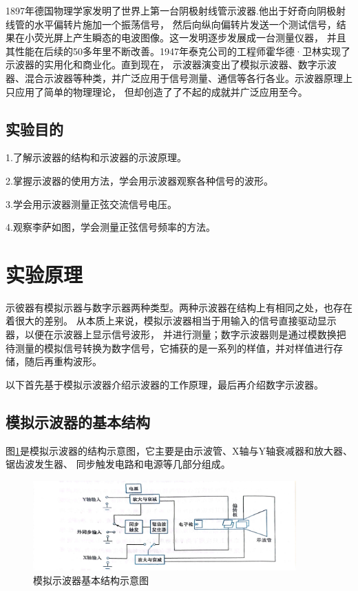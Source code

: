 \documentclass{ctexart}
\begin{document}
  1897年德国物理学家发明了世界上第一台阴极射线管示波器.他出于好奇向阴极射线管的水平偏转片施加一个振荡信号，
  然后向纵向偏转片发送一个测试信号，结果在小荧光屏上产生瞬态的电波图像。这一发明逐步发展成一台测量仪器，
  并且其性能在后续的50多年里不断改善。1947年泰克公司的工程师霍华德·卫林实现了示波器的实用化和商业化。直到现在，
  示波器演变出了模拟示波器、数字示波器、混合示波器等种类，并广泛应用于信号测量、通信等各行各业。示波器原理上只应用了简单的物理理论，
  但却创造了了不起的成就并广泛应用至今。
  \subsection{实验目的}
  1.\quad 了解示波器的结构和示波器的示波原理。

  2.\quad 掌握示波器的使用方法，学会用示波器观察各种信号的波形。
  
  3.\quad 学会用示波器测量正弦交流信号电压。

  4.\quad 观察李萨如图，学会测量正弦信号频率的方法。

\section{实验原理}
示彼器有模拟示器与数字示器两种类型。两种示波器在结构上有相同之处，也存在着很大的差别。
从本质上来说，模拟示波器相当于用输入的信号直接驱动显示器，以便在示波器上显示信号波形，
并进行测量；数字示波器则是通过模数换把待测量的模拟信号转换为数字信号，它捕获的是一系列的样值，并对样值进行存储，随后再重构波形。

以下首先基于模拟示波器介绍示波器的工作原理，最后再介绍数字示波器。
  \subsection{模拟示波器的基本结构}
  图\ref{monijiegou}是模拟示波器的结构示意图，它主要是由示波管、X轴与Y轴衰减器和放大器、锯齿波发生器、
  同步触发电路和电源等几部分组成。

  \begin{figure}[bt]\label{monijiegou}
    \centering
    \includegraphics[width=0.9\textwidth,height=0.3\textheight]{monijiegou.jpg}
    \caption{模拟示波器基本结构示意图}
  \end{figure}
\end{document}
